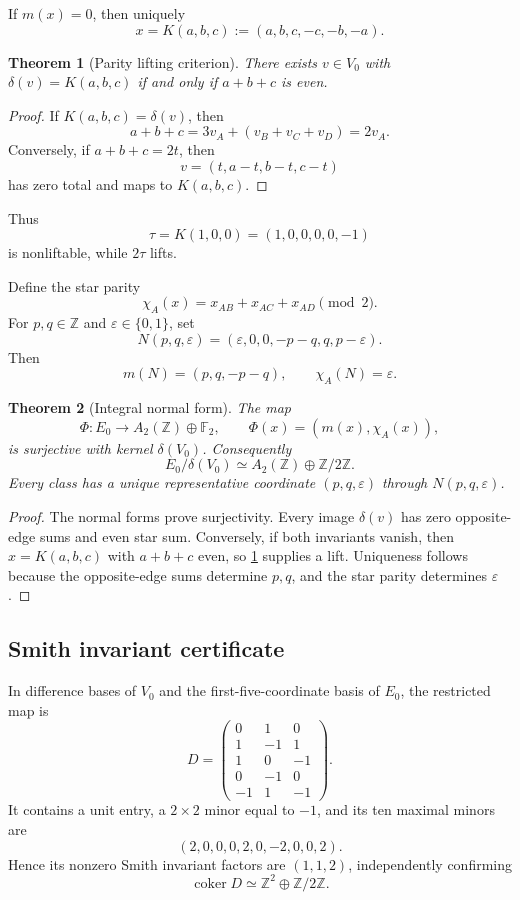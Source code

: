 \documentclass[11pt]{amsart}
\newtheorem{theorem}{Theorem}[section]
\theoremstyle{definition}
\theoremstyle{remark}
\newcommand{\Z}{\mathbb Z}
\newcommand{\F}{\mathbb F}
\newcommand{\coker}{\operatorname{coker}}
\begin{document}
If $m(x)=0$, then uniquely
\[
 x=K(a,b,c):=(a,b,c,-c,-b,-a).
\]

\begin{theorem}[Parity lifting criterion]\label{thm:lift}
There exists $v\in V_0$ with $\delta(v)=K(a,b,c)$ if and only if $a+b+c$ is even.
\end{theorem}

\begin{proof}
If $K(a,b,c)=\delta(v)$, then
\[
 a+b+c=3v_A+(v_B+v_C+v_D)=2v_A.
\]
Conversely, if $a+b+c=2t$, then
\[
 v=(t,a-t,b-t,c-t)
\]
has zero total and maps to $K(a,b,c)$.
\end{proof}

Thus
\[
 \tau=K(1,0,0)=(1,0,0,0,0,-1)
\]
is nonliftable, while $2\tau$ lifts.

Define the star parity
\[
 \chi_A(x)=x_{AB}+x_{AC}+x_{AD}\pmod2.
\]
For $p,q\in\Z$ and $\varepsilon\in\{0,1\}$, set
\[
 N(p,q,\varepsilon)
 = (\varepsilon,0,0,-p-q,q,p-\varepsilon).
\]
Then
\[
 m(N)=(p,q,-p-q),\qquad \chi_A(N)=\varepsilon.
\]

\begin{theorem}[Integral normal form]\label{thm:normal}
The map
\[
 \Phi:E_0\to A_2(\Z)\oplus\F_2,
 \qquad \Phi(x)=(m(x),\chi_A(x)),
\]
is surjective with kernel $\delta(V_0)$. Consequently
\[
 \boxed{E_0/\delta(V_0)\simeq A_2(\Z)\oplus\Z/2\Z.}
\]
Every class has a unique representative coordinate $(p,q,\varepsilon)$ through $N(p,q,\varepsilon)$.
\end{theorem}

\begin{proof}
The normal forms prove surjectivity. Every image $\delta(v)$ has zero opposite-edge sums and even star sum. Conversely, if both invariants vanish, then $x=K(a,b,c)$ with $a+b+c$ even, so \cref{thm:lift} supplies a lift. Uniqueness follows because the opposite-edge sums determine $p,q$, and the star parity determines $\varepsilon$.
\end{proof}

\subsection{Smith invariant certificate}

In difference bases of $V_0$ and the first-five-coordinate basis of $E_0$, the restricted map is
\[
D=\begin{pmatrix}
0&1&0\\
1&-1&1\\
1&0&-1\\
0&-1&0\\
-1&1&-1
\end{pmatrix}.
\]
It contains a unit entry, a $2\times2$ minor equal to $-1$, and its ten maximal minors are
\[
(2,0,0,0,2,0,-2,0,0,2).
\]
Hence its nonzero Smith invariant factors are $(1,1,2)$, independently confirming
\[
 \coker D\simeq\Z^2\oplus\Z/2\Z.
\]
\end{document}
